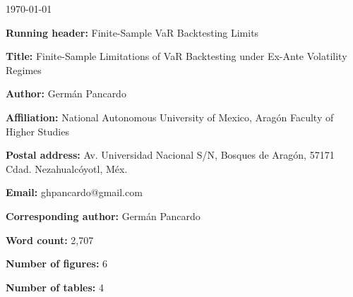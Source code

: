 \documentclass[12pt,a4paper]{article}
\begin{document}
\begin{flushright}
\today
\end{flushright}

\vspace{1cm}

\noindent\textbf{Running header:} Finite-Sample VaR Backtesting Limits

\medskip

\noindent\textbf{Title:} Finite-Sample Limitations of VaR Backtesting under Ex-Ante Volatility Regimes

\medskip

\noindent\textbf{Author:} Germ\'an Pancardo

\medskip

\noindent\textbf{Affiliation:} National Autonomous University of Mexico,
Arag\'on Faculty of Higher Studies

\medskip

\noindent\textbf{Postal address:} Av. Universidad Nacional S/N,
Bosques de Arag\'on, 57171 Cdad. Nezahualc\'oyotl, M\'ex.

\medskip

\noindent\textbf{Email:} ghpancardo@gmail.com

\medskip

\noindent\textbf{Corresponding author:} Germ\'an Pancardo

\medskip

\noindent\textbf{Word count:} 2,707

\medskip

\noindent\textbf{Number of figures:} 6

\medskip

\noindent\textbf{Number of tables:} 4
\end{document}
